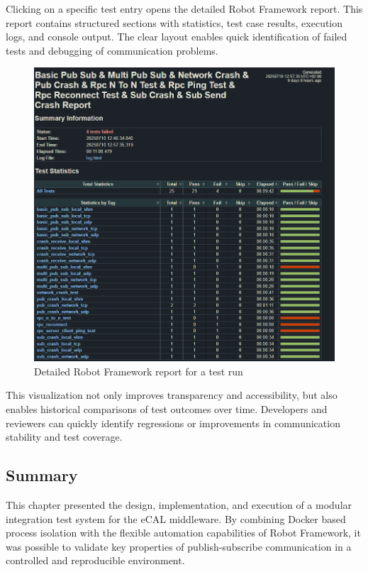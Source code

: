 \vspace{0.5em}
Clicking on a specific test entry opens the detailed Robot Framework report. This report contains structured sections with statistics, test case results, execution logs, and console output. The clear layout enables quick identification of failed tests and debugging of communication problems.

\begin{figure}[H]
	\centering
	\includegraphics[width=\textwidth]{Images/robot_report_example.png}
	\caption{Detailed Robot Framework report for a test run}
	\label{fig:robot_report}
\end{figure}

\vspace{0.5em}
This visualization not only improves transparency and accessibility, but also enables historical comparisons of test outcomes over time. Developers and reviewers can quickly identify regressions or improvements in communication stability and test coverage.

\newpage
\subsection{Summary}

This chapter presented the design, implementation, and execution of a modular integration test system for the eCAL middleware. By combining Docker based process isolation with the flexible automation capabilities of Robot Framework, it was possible to validate key properties of publish-subscribe communication in a controlled and reproducible environment.

